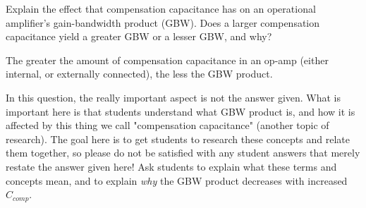 

Explain the effect that compensation capacitance has on an operational amplifier's gain-bandwidth product (GBW).  Does a larger compensation capacitance yield a greater GBW or a lesser GBW, and why?







The greater the amount of compensation capacitance in an op-amp (either internal, or externally connected), the less the GBW product.







In this question, the really important aspect is not the answer given.  What is important here is that students understand what GBW product is, and how it is affected by this thing we call "compensation capacitance" (another topic of research).  The goal here is to get students to research these concepts and relate them together, so please do not be satisfied with any student answers that merely restate the answer given here!  Ask students to explain what these terms and concepts mean, and to explain {\it why} the GBW product decreases with increased $C_{comp}$.




